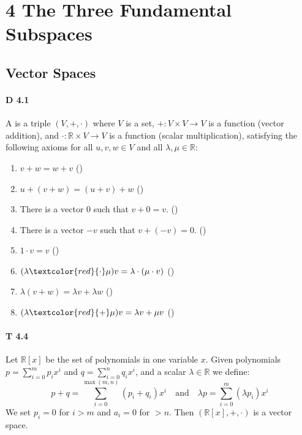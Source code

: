\section*{4 The Three Fundamental Subspaces}
\subsection{Vector Spaces}

\paragraph{D 4.1} A  is a triple $(V,+,\cdot)$ where
$V$ is a set, $+:V\times V\to V$ is a function (vector addition), and $\cdot :
\mathbb{R}\times V\to V$ is a function (scalar multiplication), satisfying the
following axioms for all $u,v,w\in V$ and all
$\lambda,\mu\in\mathbb{R}$:

\begin{enumerate}

    \item $v+w=w+v$
        \hfill ()

    \item $u+(v+w) = (u+v)+w$
        \hfill ()

    \item There is a vector $0$ such that $v+0=v$.
        \hfill ()

    \item There is a vector $-v$ such that $v+(-v)=0$.
        \hfill ()

    \item $1\cdot v = v$
        \hfill ()

    \item $(\lambda\textcolor{red}{\cdot}\mu)v=\lambda\cdot(\mu\cdot v)$
        \hfill ()

    \item $\lambda(v+w)=\lambda v+\lambda w$
        \hfill ()

    \item $(\lambda\textcolor{red}{+}\mu)v = \lambda v + \mu v$
        \hfill ()

\end{enumerate}

\paragraph{T 4.4} Let $\mathbb{R}[x]$ be the set of polynomials in one
variable $x$. Given polynomials $p=\sum_{i=0}^{m}p_ix^i$ and
$q=\sum_{i=0}^{n}q_ix^i$, and a scalar $\lambda\in\mathbb{R}$ we define:
\begin{equation*}
    p+q = \sum_{i=0}^{\max(m,n)}(p_i+q_i)x^i
    \quad \text{and} \quad
    \lambda p = \sum_{i=0}^{m}(\lambda p_i)x^i
\end{equation*}
We set $p_i=0$ for $i>m$ and $a_i=0$ for $>n$. Then $(\mathbb{R}[x],+,\cdot)$ is a vector space.


